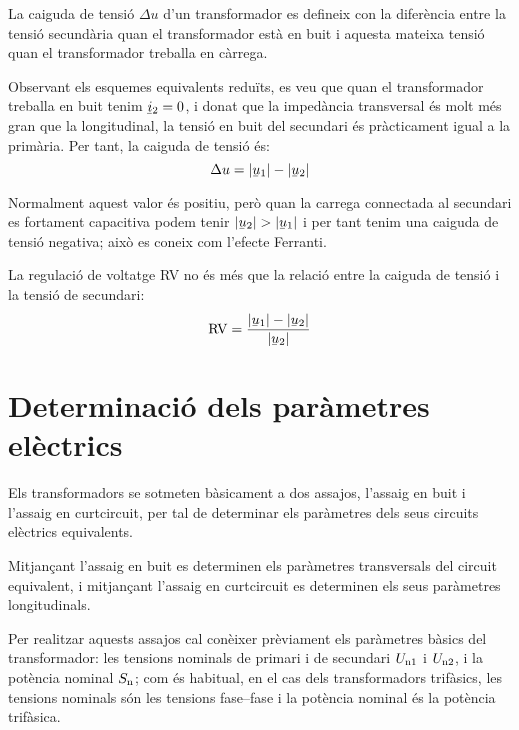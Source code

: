 La caiguda de tensió $\Delta u$ d'un transformador  es defineix con la diferència entre la tensió secundària quan el transformador està en buit i aquesta mateixa tensió quan el transformador treballa en càrrega.

Observant els esquemes equivalents reduïts, es veu que quan el transformador treballa en buit tenim $\cmplx{i}_2=0$, i donat que la impedància transversal és molt més gran que la longitudinal, la tensió en buit del secundari és pràcticament igual a la primària. Per tant, la caiguda de tensió és:
\begin{equation}
    \Delta u = |\cmplx{u}_1| - |\cmplx{u}_2|
\end{equation}

Normalment aquest valor és positiu, però quan la carrega connectada al secundari es fortament capacitiva podem tenir  $|\cmplx{u}_2| > |\cmplx{u}_1|$ i per tant tenim una caiguda de tensió negativa; això es coneix com l'efecte Ferranti.

La regulació de voltatge RV no és més que la relació entre la caiguda de tensió i la tensió de secundari:
\begin{equation}
    \text{RV} = \frac{|\cmplx{u}_1| - |\cmplx{u}_2|}{|\cmplx{u}_2|}
\end{equation}

\section{Determinació dels paràmetres elèctrics}\label{sec:determ-param-trafo}

Els transformadors se sotmeten bàsicament a dos assajos, l'assaig en
buit i l'assaig en curtcircuit, per tal de determinar els paràmetres
dels seus circuits elèctrics equivalents.

Mitjançant l'assaig en buit es determinen els paràmetres
transversals del circuit equivalent, i mitjançant l'assaig en curtcircuit es determinen els seus paràmetres longitudinals.

Per  realitzar aquests assajos cal conèixer prèviament els paràmetres
bàsics del transformador: les tensions nominals de primari i de
secundari $U_\mathrm{n1}$ i $U_\mathrm{n2}$, i la potència nominal
$S_\mathrm{n}$; com és habitual, en el cas dels transformadors
trifàsics, les tensions nominals són les tensions fase--fase i la
potència nominal és la potència trifàsica.

